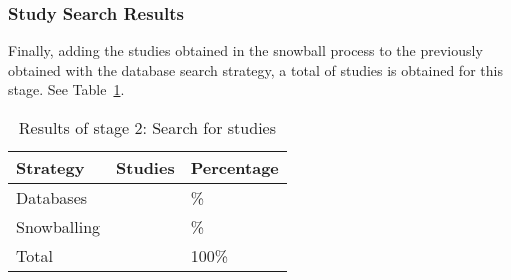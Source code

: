 \newcommand{\totalEtapaDos}{\fpeval{\screenTot + \snowballNewStudies}}
\newcommand{\dbPercentEtapa}{\fpeval{round(\screenTot*100/\totalEtapaDos,2)}}
\newcommand{\snowPercentEtapa}{\fpeval{round(\snowballNewStudies*100/\totalEtapaDos,2)}}

\subsubsection{Study Search Results}\label{subsubsec:resultados-busqueda}

Finally, adding the \snowballNewStudies{} studies obtained in the snowball process to the \screenTot{} previously obtained with the database search strategy, a total of \totalEtapaDos{} studies is obtained for this stage. See Table~\ref{table:resultados_etapa_2}.

\begin{table}[ht]
    \renewcommand{\arraystretch}{1.3}
    \centering
	\caption{Results of stage 2: Search for studies}
	\begin{tabular}{p{2.4cm}p{1.8cm}p{2.0cm}}
        \hline
		\textbf{Strategy} & \textbf{Studies} & \textbf{Percentage} \\
		\hline
        Databases         & \screenTot{}          & \dbPercentEtapa{}\%   \\
		Snowballing       & \snowballNewStudies{} & \snowPercentEtapa{}\% \\
		Total             & \totalEtapaDos        & 100\%                 \\
        \hline
    \end{tabular}
	\label{table:resultados_etapa_2}
\end{table}
